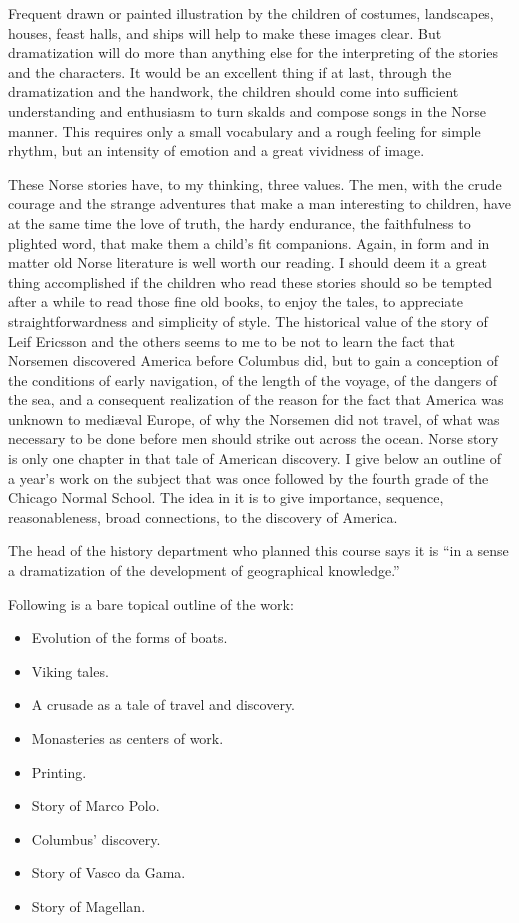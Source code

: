 Frequent drawn or painted illustration by the children of costumes,
landscapes, houses, feast halls, and ships will help to make these
images clear. But dramatization will do more than anything else for the
interpreting of the stories and the characters. It would be an excellent
thing if at last, through the dramatization and the handwork, the
children should come into sufficient understanding and enthusiasm to
turn skalds and compose songs in the Norse manner. This requires only a
small vocabulary and a rough feeling for simple rhythm, but an intensity
of emotion and a great vividness of image.

These Norse stories have, to my thinking, three values. The men, with
the crude courage and the strange adventures that make a man interesting
to children, have at the same time the love of truth, the hardy
endurance, the faithfulness to plighted word, that make them a child's
fit companions. Again, in form and in matter old Norse literature is
well worth our reading. I should deem it a great thing accomplished if
the children who read these stories should so be tempted after a while
to read those fine old books, to enjoy the tales, to appreciate
straightforwardness and simplicity of style. The historical value of the
story of Leif Ericsson and the others seems to me to be not to learn the
fact that Norsemen discovered America before Columbus did, but to gain a
conception of the conditions of early navigation, of the length of the
voyage, of the dangers of the sea, and a consequent realization of the
reason for the fact that America was unknown to mediæval Europe, of why
the Norsemen did not travel, of what was necessary to be done before men
should strike out across the ocean. Norse story is only one chapter in
that tale of American discovery. I give below an outline of a year's
work on the subject that was once followed by the fourth grade of the
Chicago Normal School. The idea in it is to give importance, sequence,
reasonableness, broad connections, to the discovery of America.

The head of the history department who planned this course says it is
``in a sense a dramatization of the development of geographical
knowledge.''

Following is a bare topical outline of the work:

\begin{itemize}[itemsep=0pt]
\item Evolution of the forms of boats.
\item Viking tales.
\item A crusade as a tale of travel and discovery.
\item Monasteries as centers of work.
\item Printing.
\item Story of Marco Polo.
\item Columbus' discovery.
\item Story of Vasco da Gama.
\item Story of Magellan.
\end{itemize}

